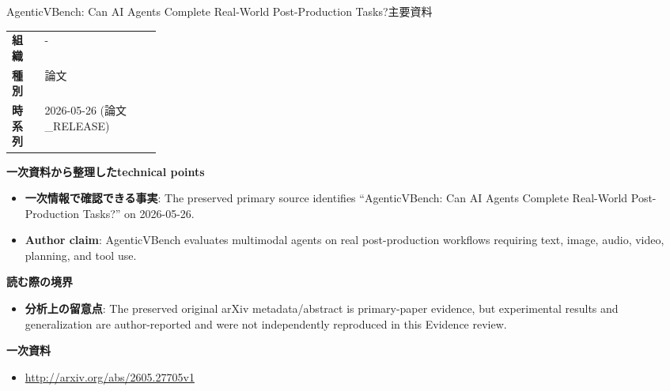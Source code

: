 \begin{technicalnote}{AgenticVBench: Can AI Agents Complete Real-World Post-Production Tasks?}{主要資料}
\begin{tabularx}{\linewidth}{@{}>{\bfseries}p{0.22\linewidth}X@{}}
組織 & - \\
種別 & 論文 \\
時系列 & 2026-05-26 (論文\_RELEASE) \\
\end{tabularx}
\smallskip
{\bfseries 一次資料から整理したtechnical points}
\begin{itemize}[leftmargin=1.5em,itemsep=0.35em]
\item \textbf{一次情報で確認できる事実}: The preserved primary source identifies “AgenticVBench: Can AI Agents Complete Real-World Post-Production Tasks?” on 2026-05-26.
\item \textbf{Author claim}: AgenticVBench evaluates multimodal agents on real post-production workflows requiring text, image, audio, video, planning, and tool use.
\end{itemize}
{\bfseries 読む際の境界}
\begin{itemize}[leftmargin=1.5em,itemsep=0.35em]
\item \textbf{分析上の留意点}: The preserved original arXiv metadata/abstract is primary-paper evidence, but experimental results and generalization are author-reported and were not independently reproduced in this Evidence review.
\end{itemize}
{\bfseries 一次資料}
\begingroup\sloppy
\begin{itemize}[leftmargin=1.5em,itemsep=0.25em]
\item {\scriptsize\url{http://arxiv.org/abs/2605.27705v1}}
\end{itemize}
\endgroup
\end{technicalnote}
\medskip

